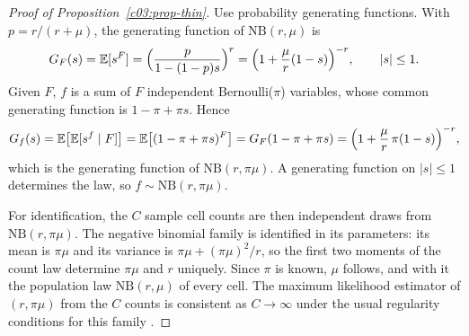 \begin{proof}[Proof of Proposition~\ref{c03:prop-thin}]
Use probability generating functions. With $p = r/(r+\mu)$, the generating function of
$\mathrm{NB}(r,\mu)$ is
\[
G_F(s) = \mathbb{E}[s^F] = \Big(\frac{p}{1-(1-p)s}\Big)^{r}
= \Big(1 + \frac{\mu}{r}(1-s)\Big)^{-r}, \qquad |s| \le 1 .
\]
Given $F$, $f$ is a sum of $F$ independent Bernoulli($\pi$) variables, whose common
generating function is $1-\pi+\pi s$. Hence
\[
G_f(s) = \mathbb{E}\big[\mathbb{E}[s^f \mid F]\big] = \mathbb{E}\big[(1-\pi+\pi s)^F\big]
= G_F(1-\pi+\pi s)
= \Big(1 + \frac{\mu}{r}\,\pi(1-s)\Big)^{-r},
\]
which is the generating function of $\mathrm{NB}(r,\pi\mu)$. A generating function on
$|s|\le 1$ determines the law, so $f \sim \mathrm{NB}(r,\pi\mu)$.

For identification, the $C$ sample cell counts are then independent draws from
$\mathrm{NB}(r,\pi\mu)$. The negative binomial family is identified in its parameters:
its mean is $\pi\mu$ and its variance is $\pi\mu + (\pi\mu)^2/r$, so the first two
moments of the count law determine $\pi\mu$ and $r$ uniquely. Since $\pi$ is known,
$\mu$ follows, and with it the population law $\mathrm{NB}(r,\mu)$ of every cell. The
maximum likelihood estimator of $(r,\pi\mu)$ from the $C$ counts is consistent as
$C \to \infty$ under the usual regularity conditions for this family
\citep{vandervaart1998}.
\end{proof}
